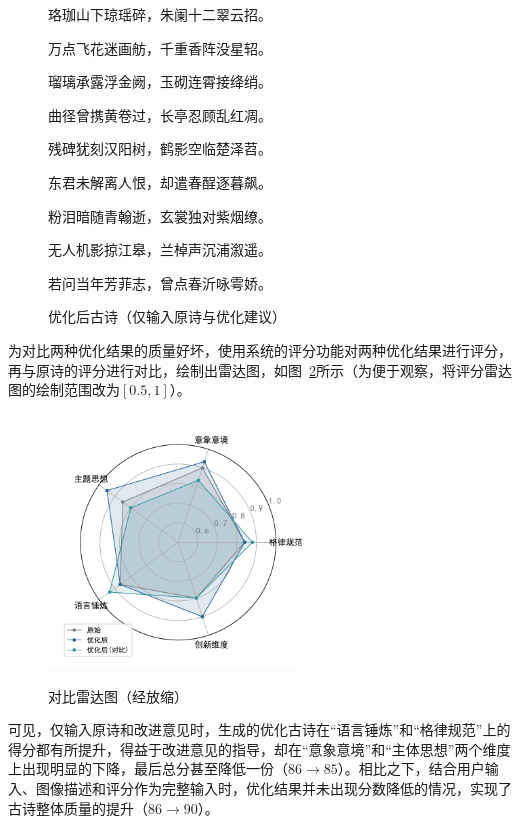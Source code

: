 \begin{figure}[ht]
  \centering
  \begin{tcolorbox}[
      colback=white,
      colframe=black,
      boxrule=1pt,
      arc=0mm,
      width=0.6\linewidth,  %
      ]
      \kaishu
      \centering
      珞珈山下琼瑶碎，朱阑十二翠云招。\par
      万点飞花迷画舫，千重香阵没星轺。\par
      瑠璃承露浮金阙，玉砌连霄接绛绡。\par
      曲径曾携黄卷过，长亭忍顾乱红凋。\par
      残碑犹刻汉阳树，鹤影空临楚泽苕。\par
      东君未解离人恨，却遣春酲逐暮飙。\par
      粉泪暗随青翰逝，玄裳独对紫烟缭。\par
      无人机影掠江皋，兰棹声沉浦溆遥。\par
      若问当年芳菲志，曾点春沂咏雩娇。
  \end{tcolorbox}
  \caption{优化后古诗（仅输入原诗与优化建议）}
  \label{fig:example_poem_optimized_bad}
\end{figure}

为对比两种优化结果的质量好坏，使用系统的评分功能对两种优化结果进行评分，再与原诗的评分进行对比，绘制出雷达图，如图~\ref{fig:radar_comparison}所示（为便于观察，将评分雷达图的绘制范围改为$[0.5,1]$）。

\begin{figure}[ht]
  \centering
  \includegraphics[width=0.6\textwidth]
  {figures/雷达图（对比）.pdf}\\
  \caption{对比雷达图（经放缩）}
  \label{fig:radar_comparison} %
\end{figure}

可见，仅输入原诗和改进意见时，生成的优化古诗在“语言锤炼”和“格律规范”上的得分都有所提升，得益于改进意见的指导，却在“意象意境”和“主体思想”两个维度上出现明显的下降，最后总分甚至降低一份（$86\rightarrow85$）。相比之下，结合用户输入、图像描述和评分作为完整输入时，优化结果并未出现分数降低的情况，实现了古诗整体质量的提升（$86\rightarrow90$）。 

